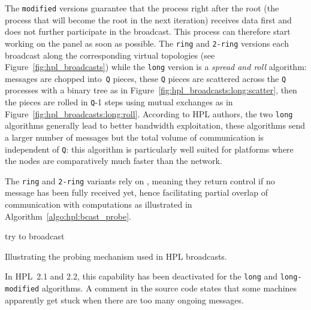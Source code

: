 \begin{itemize}
                The \texttt{modified} versions guarantee that the process right after the root (\ie the process that
                will become the root in the next iteration) receives data first and does not further participate in the
                broadcast. This process can therefore start working on the panel as soon as possible. The \texttt{ring}
                and \texttt{2-ring} versions each broadcast along the corresponding virtual topologies (see
                Figure~\ref{fig:hpl_broadcasts}) while the
                \texttt{long} version is a \emph{spread and roll} algorithm: messages are chopped into \texttt{Q}
                pieces, these \texttt{Q} pieces are scattered across the \texttt{Q} processes with a binary tree as in
                Figure~\ref{fig:hpl_broadcasts:long:scatter}, then the pieces are rolled in \texttt{Q}-1 steps using
                mutual exchanges as in Figure~\ref{fig:hpl_broadcasts:long:roll}. According to HPL authors, the two
                \texttt{long} algorithms generally lead to better bandwidth exploitation, these algorithms send a larger
                number of messages but the total volume of communication is independent of \texttt{Q}: this algorithm is
                particularly well suited for platforms where the nodes are comparatively much faster than the network.

                The \texttt{ring} and \texttt{2-ring} variants rely on \iprobe, meaning they return control
                if no message has been fully received yet, hence facilitating partial overlap of communication with
                computations as illustrated in Algorithm~\ref{algo:hpl:bcast_probe}.

                \begin{minipage}{\linewidth}\begin{algorithm}[H]
                    \DontPrintSemicolon
                    try to broadcast\;
                    \caption{Illustrating the probing mechanism used in HPL broadcasts.}
                    \label{algo:hpl:bcast_probe}
                \end{algorithm}\end{minipage}

                In HPL 2.1 and 2.2, this capability has been deactivated for the \texttt{long} and
                \texttt{long-modified} algorithms. A comment in the source code states that some machines apparently get
                stuck when there are too many ongoing messages.
        \end{itemize}

